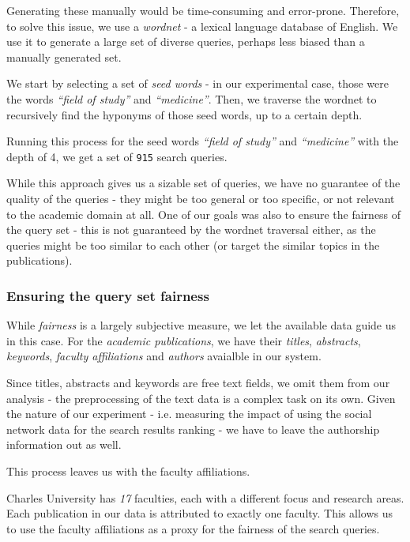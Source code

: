 Generating these manually would be time-consuming and error-prone. 
Therefore, to solve this issue, we use a \textit{wordnet} - a lexical language database of English.
We use it to generate a large set of diverse queries, perhaps less biased than a manually generated set.

We start by selecting a set of \textit{seed words} - in our experimental case, those were the words \textit{``field of study''} and \textit{``medicine''}.
Then, we traverse the wordnet to recursively find the hyponyms of those seed words, up to a certain depth.

Running this process for the seed words \textit{``field of study''} and \textit{``medicine''} with the depth of 4, we get a set of \texttt{915} search queries.

While this approach gives us a sizable set of queries, we have no guarantee of the quality of the queries - they might be too general or too specific, or not relevant to the academic domain at all.
One of our goals was also to ensure the fairness of the query set - this is not guaranteed by the wordnet traversal either, as the queries might be too similar to each other (or target the similar topics in the publications).

\subsubsection{Ensuring the query set fairness}

While \textit{fairness} is a largely subjective measure, we let the available data guide us in this case.
For the \textit{academic publications}, we have their \textit{titles}, \textit{abstracts}, \textit{keywords}, \textit{faculty affiliations} and \textit{authors} avaialble in our system.

Since titles, abstracts and keywords are free text fields, we omit them from our analysis - the preprocessing of the text data is a complex task on its own.
Given the nature of our experiment - i.e. measuring the impact of using the social network data for the search results ranking - we have to leave the authorship information out as well.

This process leaves us with the faculty affiliations.

Charles University has \textit{17} faculties, each with a different focus and research areas.
Each publication in our data is attributed to exactly one faculty.
This allows us to use the faculty affiliations as a proxy for the fairness of the search queries.

